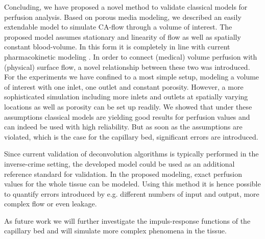 \documentclass[paper=a4, fontsize=11pt,parskip=half,headings=small]{scrartcl}
\begin{document}
	Concluding, we have proposed a novel method to validate classical models for perfusion analysis.
	Based on porous media modeling, we described an easily extendable model to simulate CA-flow through a volume of interest.
	The proposed model assumes stationary and linearity of flow as well as spatially constant blood-volume.
	In this form it is completely in line with current pharmacokinetic modeling \cite{sourbron14}.
	In order to connect (medical) volume perfusion with (physical) surface flow, a novel relationship between these two was introduced.
	For the experiments we have confined to a most simple setup, modeling a volume of interest with one inlet, one outlet and constant porosity.
	However, a more sophisticated simulation including more inlets and outlets at spatially varying locations as well as porosity can be set up readily.
	We showed that under these assumptions classical models are yielding good results for perfusion values and can indeed be used with high reliability.
	But as soon as the assumptions are violated, which is the case for the capillary bed, significant errors are introduced.

	Since current validation of deconvolution algorithms is typically performed in the inverse-crime setting, the developed model could be used as an additional reference standard for validation.
	In the proposed modeling, exact perfusion values for the whole tissue can be modeled. 
	Using this method it is hence possible to quantify errors introduced by e.g. different numbers of input and output, more complex flow or even leakage.
	
	As future work we will further investigate the impuls-response functions of the capillary bed and will simulate more complex phenomena in the tissue.

	
		
	

	
\end{document}
